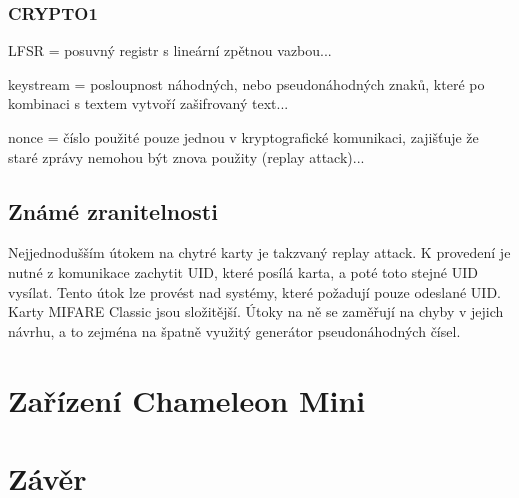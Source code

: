 \subsection{CRYPTO1}
LFSR = posuvný registr s lineární zpětnou vazbou...

keystream = posloupnost náhodných, nebo pseudonáhodných znaků, které po kombinaci s textem vytvoří zašifrovaný text...

nonce = číslo použité pouze jednou v kryptografické komunikaci, zajišťuje že staré zprávy nemohou být znova použity (replay attack)...

\section{Známé zranitelnosti}
Nejjednodušším útokem na chytré karty je takzvaný replay attack. K provedení je nutné z komunikace zachytit UID, které posílá karta, a poté toto stejné UID vysílat. Tento útok lze provést nad systémy, které požadují pouze odeslané UID. Karty MIFARE Classic jsou složitější. Útoky na ně se zaměřují na chyby v jejich návrhu, a to zejména na špatně využitý generátor pseudonáhodných čísel\cite{Mifare_Classic_story}. 
\par





\chapter{Zařízení Chameleon Mini}
\label{zarizeni_chameleon_mini}







\chapter{Závěr}
\label{zaver}


